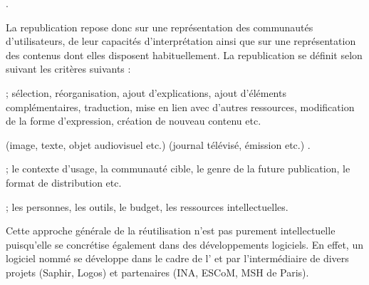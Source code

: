  \parencite{Stockinger2007b}.

La republication repose donc sur une représentation des communautés d'utilisateurs, de leur capacités d'interprétation ainsi que sur une représentation des contenus dont elles disposent habituellement. 
La republication se définit selon \parencite{Stockinger2007} suivant les critères suivants : 
\begin{liste}
	\item {} ; sélection, réorganisation, ajout d'explications, ajout d'éléments complémentaires, traduction, mise en lien avec d'autres ressources, modification de la forme d'expression, création de nouveau contenu etc.
	\item {} (image, texte, objet audiovisuel etc.)  (journal télévisé, émission etc.) . 
	\item {} ; le contexte d'usage, la communauté cible, le genre de la future publication, le format de distribution etc.
	\item {} ; les personnes, les outils, le budget, les ressources intellectuelles.
\end{liste}
Cette approche générale de la réutilisation n'est pas purement intellectuelle puisqu'elle se concrétise également dans des développements logiciels. 
En effet, un logiciel nommé  se développe dans le cadre de l' et par l'intermédiaire de divers projets (Saphir, Logos) et partenaires (INA, ESCoM, MSH de Paris).

